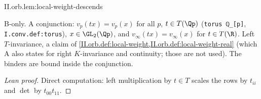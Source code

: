 \begin{lemma}
\bonly
{}
\end{lemma}
\begin{tfformal}{II.orb.lem:local-weight-descends}
\begin{tffidelity}
B-only. A conjunction: $v_p(tx)=v_p(x)$ for all $p$, $t\in T(\Qp)$ (\texttt{torus ℚ\_[p]}, \texttt{I.conv.def:torus}), $x\in\GL_2(\Qp)$, and $v_\infty(tx)=v_\infty(x)$ for $t\in T(\R)$. Left $T$-invariance, a claim of \cref{II.orb.def:local-weight,II.orb.def:local-weight-real} (which A also states for right $K$-invariance and continuity; those are not used). The binders are bound inside the conjunction.
\end{tffidelity}
\end{tfformal}
\begin{proof}[Lean proof]
Direct computation: left multiplication by $t\in T$ scales the rows by $t_{ii}$ and $\det$ by $t_{00}t_{11}$.
\end{proof}


